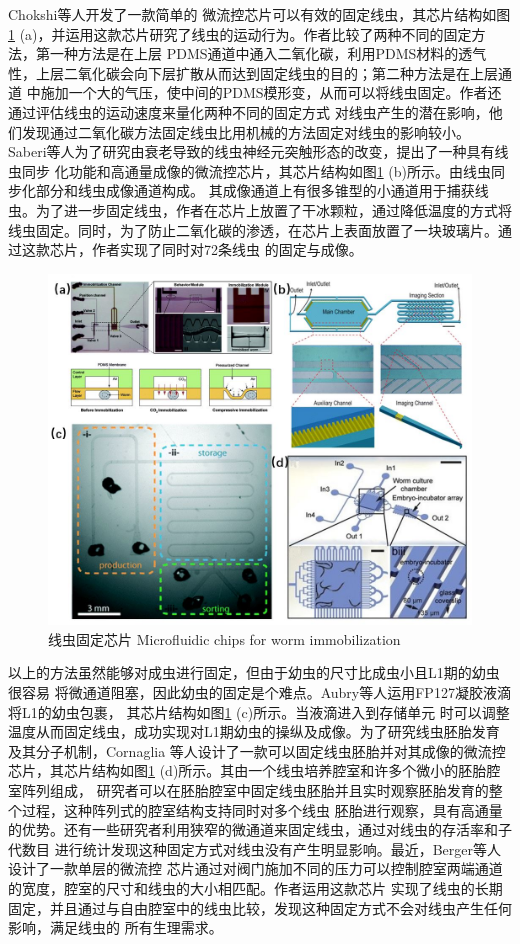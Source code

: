 	Chokshi等人\cite{Chokshi2009CO2}开发了一款简单的
	微流控芯片可以有效的固定线虫，其芯片结构如图\ref{fig:immobilization} (a)，并运用这款芯片研究了线虫的运动行为。作者比较了两种不同的固定方法，第一种方法是在上层
	PDMS通道中通入二氧化碳，利用PDMS材料的透气性，上层二氧化碳会向下层扩散从而达到固定线虫的目的；第二种方法是在上层通道
	中施加一个大的气压，使中间的PDMS模形变，从而可以将线虫固定。作者还通过评估线虫的运动速度来量化两种不同的固定方式
	对线虫产生的潜在影响，他们发现通过二氧化碳方法固定线虫比用机械的方法固定对线虫的影响较小。
	Saberi等人\cite{saberi2018microfluidic}为了研究由衰老导致的线虫神经元突触形态的改变，提出了一种具有线虫同步
	化功能和高通量成像的微流控芯片，其芯片结构如图\ref{fig:immobilization} (b)所示。由线虫同步化部分和线虫成像通道构成。
	其成像通道上有很多锥型的小通道用于捕获线虫。为了进一步固定线虫，作者在芯片上放置了干冰颗粒，通过降低温度的方式将
	线虫固定。同时，为了防止二氧化碳的渗透，在芯片上表面放置了一块玻璃片。通过这款芯片，作者实现了同时对72条线虫
	的固定与成像。
	\begin{figure}[t]
	  \centering
	  \includegraphics[width=12cm]{figure/chap1/immobilization.jpg}
	  \bicaption
		{线虫固定芯片}
		{Microfluidic chips for worm immobilization}
	  \label{fig:immobilization}
	\end{figure}
	
	以上的方法虽然能够对成虫进行固定，但由于幼虫的尺寸比成虫小且L1期的幼虫很容易
	将微通道阻塞，因此幼虫的固定是个难点。Aubry等人\cite{Aubry2015Hydrogel}运用FP127凝胶液滴将L1的幼虫包裹，
	其芯片结构如图\ref{fig:immobilization} (c)所示。当液滴进入到存储单元
	时可以调整温度从而固定线虫，成功实现对L1期幼虫的操纵及成像。为了研究线虫胚胎发育及其分子机制，Cornaglia
	等人\cite{Cornaglia2015An}设计了一款可以固定线虫胚胎并对其成像的微流控芯片，其芯片结构如图\ref{fig:immobilization} (d)所示。其由一个线虫培养腔室和许多个微小的胚胎腔室阵列组成，
	研究者可以在胚胎腔室中固定线虫胚胎并且实时观察胚胎发育的整个过程，这种阵列式的腔室结构支持同时对多个线虫
	胚胎进行观察，具有高通量的优势。还有一些研究者利用狭窄的微通道来固定线虫\cite{Lee2014A,Hulme2007A}，通过对线虫的存活率和子代数目
	进行统计发现这种固定方式对线虫没有产生明显影响。最近，Berger等人\cite{berger2018long}设计了一款单层的微流控
	芯片通过对阀门施加不同的压力可以控制腔室两端通道的宽度，腔室的尺寸和线虫的大小相匹配。作者运用这款芯片
	实现了线虫的长期固定，并且通过与自由腔室中的线虫比较，发现这种固定方式不会对线虫产生任何影响，满足线虫的
	所有生理需求。
